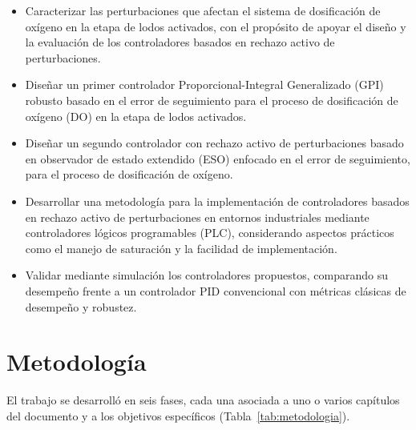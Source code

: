 \begin{itemize}
  \item[\textbf{OE1}] Caracterizar las perturbaciones que afectan el sistema de dosificación de
  oxígeno en la etapa de lodos activados, con el propósito de apoyar el diseño y la evaluación de los
  controladores basados en rechazo activo de perturbaciones.
  \item[\textbf{OE2}] Diseñar un primer controlador Proporcional-Integral Generalizado (GPI) robusto
  basado en el error de seguimiento para el proceso de dosificación de oxígeno (DO) en la etapa de
  lodos activados.
  \item[\textbf{OE3}] Diseñar un segundo controlador con rechazo activo de perturbaciones basado en
  observador de estado extendido (ESO) enfocado en el error de seguimiento, para el proceso de
  dosificación de oxígeno.
  \item[\textbf{OE4}] Desarrollar una metodología para la implementación de controladores basados
  en rechazo activo de perturbaciones en entornos industriales mediante controladores lógicos
  programables (PLC), considerando aspectos prácticos como el manejo de saturación y la facilidad de
  implementación.
  \item[\textbf{OE5}] Validar mediante simulación los controladores propuestos, comparando su
  desempeño frente a un controlador PID convencional con métricas clásicas de desempeño y
  robustez.
\end{itemize}


\section{Metodología}
\label{sec:metodologia}

El trabajo se desarrolló en seis fases, cada una asociada a uno o varios capítulos del documento
y a los objetivos específicos (Tabla~\ref{tab:metodologia}).

